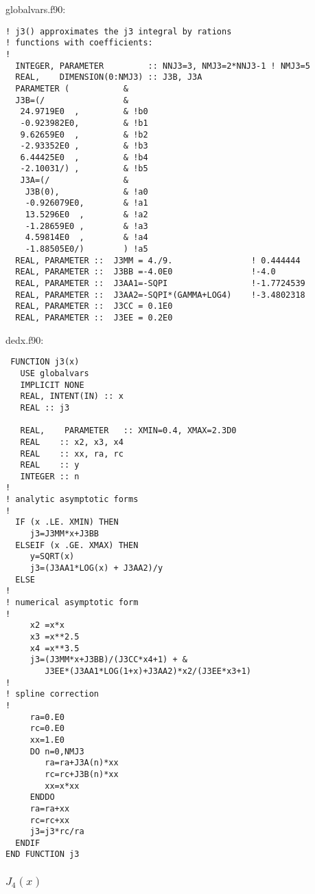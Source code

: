 \documentclass[preprint,12pt,eqsecnum,nofootinbib,amsmath,amssymb]{revtex4}
\begin{document}
{
\noindent
globalvars.f90:
\baselineskip12pt
\begin{verbatim}
! j3() approximates the j3 integral by rations
! functions with coefficients:
!
  INTEGER, PARAMETER         :: NNJ3=3, NMJ3=2*NNJ3-1 ! NMJ3=5
  REAL,    DIMENSION(0:NMJ3) :: J3B, J3A
  PARAMETER (           &
  J3B=(/                &
   24.9719E0  ,         & !b0
   -0.923982E0,         & !b1
   9.62659E0  ,         & !b2
   -2.93352E0 ,         & !b3
   6.44425E0  ,         & !b4
   -2.10031/) ,         & !b5
   J3A=(/               &
    J3B(0),             & !a0
    -0.926079E0,        & !a1
    13.5296E0  ,        & !a2
    -1.28659E0 ,        & !a3
    4.59814E0  ,        & !a4
    -1.88505E0/)        ) !a5
  REAL, PARAMETER ::  J3MM = 4./9.                ! 0.444444 
  REAL, PARAMETER ::  J3BB =-4.0E0                !-4.0       
  REAL, PARAMETER ::  J3AA1=-SQPI                 !-1.7724539 
  REAL, PARAMETER ::  J3AA2=-SQPI*(GAMMA+LOG4)    !-3.4802318 
  REAL, PARAMETER ::  J3CC = 0.1E0 
  REAL, PARAMETER ::  J3EE = 0.2E0 
\end{verbatim}
}


{
\noindent
dedx.f90:
\baselineskip12pt
\begin{verbatim}
 FUNCTION j3(x)
   USE globalvars
   IMPLICIT NONE
   REAL, INTENT(IN) :: x
   REAL :: j3

   REAL,    PARAMETER   :: XMIN=0.4, XMAX=2.3D0
   REAL    :: x2, x3, x4
   REAL    :: xx, ra, rc
   REAL    :: y
   INTEGER :: n
!
! analytic asymptotic forms
!
  IF (x .LE. XMIN) THEN
     j3=J3MM*x+J3BB
  ELSEIF (x .GE. XMAX) THEN
     y=SQRT(x)
     j3=(J3AA1*LOG(x) + J3AA2)/y
  ELSE
!
! numerical asymptotic form 
!
     x2 =x*x
     x3 =x**2.5
     x4 =x**3.5
     j3=(J3MM*x+J3BB)/(J3CC*x4+1) + &
        J3EE*(J3AA1*LOG(1+x)+J3AA2)*x2/(J3EE*x3+1)
!
! spline correction
! 
     ra=0.E0
     rc=0.E0
     xx=1.E0
     DO n=0,NMJ3
        ra=ra+J3A(n)*xx
        rc=rc+J3B(n)*xx
        xx=x*xx
     ENDDO
     ra=ra+xx
     rc=rc+xx
     j3=j3*rc/ra
  ENDIF
END FUNCTION j3
\end{verbatim}
}


\subsubsection{$J_4(x)$}
\end{document}
